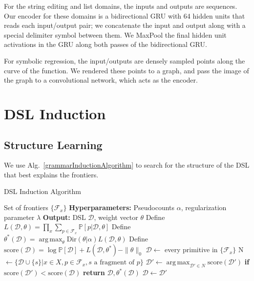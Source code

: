 \documentclass{article}
\DeclareMathOperator*{\argmax}{arg\,max} %
\newcommand{\probability}{\mathds{P}} %
\begin{document}
For the string editing and list domains,
the inputs and outputs are sequences. Our encoder for these domains is a bidirectional GRU with 64 hidden units that reads each input/output pair; we concatenate the input and output along with a special delimiter
symbol between them.
We MaxPool the final hidden unit activations in the GRU along both passes of the bidirectional GRU.

For symbolic regression,
the input/outputs are densely sampled points along the curve of the function.
We rendered these points to a graph,
and pass the image of the graph to a convolutional network,
which acts as the encoder.

\section{DSL Induction}

\subsection{Structure Learning}

We use Alg.~\ref{grammarInductionAlgorithm} to search for the structure of the DSL that best explains the frontiers.

\setcounter{algorithm}{2} %
\begin{algorithm}[hb]
   \caption{DSL Induction Algorithm}
   \label{grammarInductionAlgorithm}
   \begin{algorithmic}
      Set of frontiers $\{\mathcal{F}_x\}$
     \STATE \textbf{Hyperparameters:} Pseudocounts $\alpha$, regularization parameter $\lambda$
     \STATE \textbf{Output:} DSL $\mathcal{D}$, weight vector $\theta$
     \STATE Define $L(\mathcal{D},\theta) =  \prod_x \sum_{p\in \mathcal{F}_x} \probability[p|\mathcal{D},\theta]$
     \STATE Define $\theta^*(\mathcal{D}) = \argmax_\theta \text{Dir}(\theta|\alpha) L(\mathcal{D},\theta)$
     \STATE Define $\text{score}(\mathcal{D}) = \log \probability[\mathcal{D}] + L(\mathcal{D},\theta^*) - \|\theta\|_0$
     \STATE $\mathcal{D}\gets$ every primitive in $\{\mathcal{F}_x\}$
     \STATE N $\gets \{\mathcal{D}\cup \{s\} | x\in X, p\in \mathcal{F}_x, s\text{ a fragment  of }p\}$
     \STATE $\mathcal{D}'\gets \argmax_{\mathcal{D}'\in N}\text{score}(\mathcal{D}') $
     \STATE \textbf{if }$\text{score}(\mathcal{D}') < \text{score}(\mathcal{D})$\textbf{ return }$\mathcal{D},\theta^*(\mathcal{D})$
     \STATE $\mathcal{D}\gets\mathcal{D}'$
     \ENDWHILE
   \end{algorithmic}
\end{algorithm}
\end{document}
